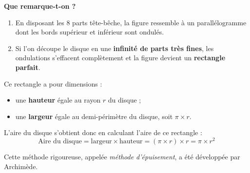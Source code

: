 \documentclass[../../syllabus_1.tex]{subfiles}
\begin{document}
\begin{tcolorbox}[title=Point historique : la formule de l'aire du disque]
\begin{center}
\end{center}

\textbf{Que remarque-t-on ?}
\begin{enumerate}
    \item En disposant les $8$ parts tête-bêche, la figure ressemble à un parallélogramme dont les bords supérieur et inférieur sont ondulés.
    \item Si l'on découpe le disque en une \textbf{infinité de parts très fines}, les ondulations s'effacent complètement et la figure devient un \textbf{rectangle parfait}.
\end{enumerate}

Ce rectangle a pour dimensions :
\begin{itemize}
    \item une \textbf{hauteur} égale au rayon $r$ du disque ;
    \item une \textbf{largeur} égale au demi-périmètre du disque, soit $\pi \times r$.
\end{itemize}

L'aire du disque s'obtient donc en calculant l'aire de ce rectangle :
\[
\text{Aire du disque} = \text{largeur} \times \text{hauteur} = (\pi \times r) \times r = \pi \times r^2
\]

Cette méthode rigoureuse, appelée \textit{méthode d'épuisement}, a été développée par Archimède.
\end{tcolorbox}
\end{document}

